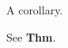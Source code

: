 \documentclass{nosuchclassxyz}
\newcommand{\thm}{\textbf{Thm}}
\begin{document}
\begin{cor}A corollary.\end{cor}
See \thm.
\end{document}
